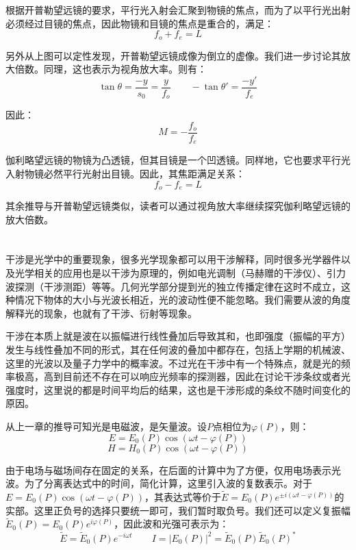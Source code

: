 根据开普勒望远镜的要求，平行光入射会汇聚到物镜的焦点，而为了以平行光出射必须经过目镜的焦点，因此物镜和目镜的焦点是重合的，满足：
\[f_o + f_e = L\]

另外从上图可以定性发现，开普勒望远镜成像为倒立的虚像。我们进一步讨论其放大倍数。同理，这也表示为视角放大率。则有：
\[\tan \theta = \dfrac{-y}{s_0} = \dfrac{y}{f_o}\qquad  -\tan \theta' = \dfrac{-y'}{f_e}\]

因此：
\[M = -\dfrac{f_o}{f_e}\]

伽利略望远镜的物镜为凸透镜，但其目镜是一个凹透镜。同样地，它也要求平行光入射物镜必然平行光射出目镜。因此，其焦距满足关系：
\[f_o - f_e = L\]

其余推导与开普勒望远镜类似，读者可以通过视角放大率继续探究伽利略望远镜的放大倍数。

\section[干涉]{}
干涉是光学中的重要现象，很多光学现象都可以用干涉解释，同时很多光学器件以及光学相关的应用也是以干涉为原理的，例如电光调制（马赫赠的干涉仪）、引力波探测（干涉测距）等等。几何光学部分提到光的独立传播定律在这时不成立，这种情况下物体的大小与光波长相近，光的波动性便不能忽略。我们需要从波的角度解释光的现象，也就有了干涉、衍射等现象。

干涉在本质上就是波在以振幅进行线性叠加后导致其和，也即强度（振幅的平方）发生与线性叠加不同的形式，其在任何波的叠加中都存在，包括上学期的机械波、这里的光波以及量子力学中的概率波。不过光在干涉中有一个特殊点，就是光的频率极高，高到目前还不存在可以响应光频率的探测器，因此在讨论干涉条纹或者光强度时，这里说的都是时间平均后的结果，这也是干涉形成的条纹不随时间变化的原因。

从上一章的推导可知光是电磁波，是矢量波。设$P$点相位为$\varphi(P)$，则：
\[E = E_0(P) \cos(\omega t - \varphi(P))\]
\[H = H_0(P) \cos(\omega t - \varphi(P))\]

由于电场与磁场间存在固定的关系，在后面的计算中为了方便，仅用电场表示光波。为了分离表达式中的时间，简化计算，这里引入波的复数表示。对于$E = E_0(P) \cos(\omega t - \varphi(P))$，其表达式等价于$\tilde{E} = E_0(P) e^{\pm i(\omega t - \varphi(P))}$的实部。这里正负号的选择只要统一即可，我们暂时取负号。我们还可以定义复振幅$\tilde{E}_0(P) = E_0(P) e^{i\varphi(P)}$，因此波和光强可表示为：
\[\tilde{E} = \tilde{E}_0(P) e^{-i\omega t}\qquad I = |E_0(P)|^2 = \tilde{E}_0(P) \tilde{E}_0(P)^*\]

